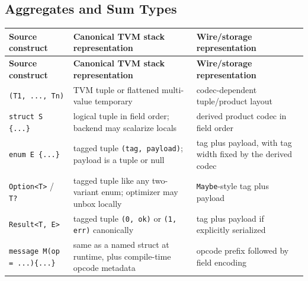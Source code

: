 \documentclass[12pt,oneside]{article}
\begin{document}
\subsection{Aggregates and Sum Types}
\begin{longtable}{|L{0.24\textwidth}|L{0.30\textwidth}|L{0.32\textwidth}|}
\hline
\textbf{Source construct} & \textbf{Canonical TVM stack representation} & \textbf{Wire/storage representation} \\ \hline
\endfirsthead
\hline
\textbf{Source construct} & \textbf{Canonical TVM stack representation} & \textbf{Wire/storage representation} \\ \hline
\endhead
\texttt{(T1, ..., Tn)} &
TVM tuple or flattened multi-value temporary &
codec-dependent tuple/product layout \\ \hline
\texttt{struct S \{...\}} &
logical tuple in field order; backend may scalarize locals &
derived product codec in field order \\ \hline
\texttt{enum E \{...\}} &
tagged tuple \texttt{(tag, payload)}; payload is a tuple or null &
tag plus payload, with tag width fixed by the derived codec \\ \hline
\texttt{Option<T>} / \texttt{T?} &
tagged tuple like any two-variant enum; optimizer may unbox locally &
\texttt{Maybe}-style tag plus payload \\ \hline
\texttt{Result<T, E>} &
tagged tuple \texttt{(0, ok)} or \texttt{(1, err)} canonically &
tag plus payload if explicitly serialized \\ \hline
\texttt{message M(op = ...)\{...\}} &
same as a named struct at runtime, plus compile-time opcode metadata &
opcode prefix followed by field encoding \\ \hline
\end{longtable}
\end{document}

